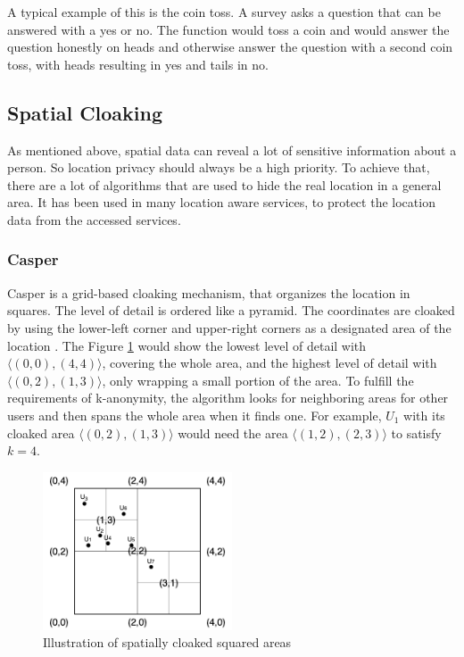 A typical example of this is the coin toss. A survey asks a question that can be answered with a yes or no. The function would toss a coin and would answer the question honestly on heads and otherwise answer the question with a second coin toss, with heads resulting in yes and tails in no. 

\subsection{Spatial Cloaking}
As mentioned above, spatial data can reveal a lot of sensitive information about a person. So location privacy should always be a high priority. To achieve that, there are a lot of algorithms that are used to hide the real location in a general area. It has been used in many location aware services, to protect the location data from the accessed services.

\subsubsection{Casper}
Casper \cite{DBLP:journals/tods/ChowMA09} is a grid-based cloaking mechanism, that organizes the location in squares. The level of detail is ordered like a pyramid. The coordinates are cloaked by using the lower-left corner and upper-right corners as a designated area of the location \cite{DBLP:conf/ssd/TanLM09}. The Figure \ref{fig:casper} would show the lowest level of detail with \(\langle(0,0),(4,4)\rangle\), covering the whole area, and the highest level of detail with \(\langle(0,2),(1,3)\rangle\), only wrapping a small portion of the area. To fulfill the requirements of k-anonymity, the algorithm looks for neighboring areas for other users and then spans the whole area when it finds one. For example, \(U_1\) with its cloaked area \(\langle(0,2),(1,3)\rangle\) would need the area \(\langle(1,2),(2,3)\rangle\) to satisfy \(k=4\).

\begin{figure}[htpb]
  \centering
  \includegraphics[width=0.5\textwidth]{figures/casper.png}
  \caption{Illustration of spatially cloaked squared areas} 
  \label{fig:casper}
\end{figure}


